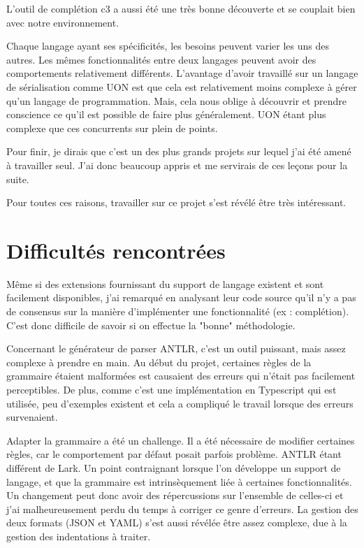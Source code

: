 \documentclass[
    iict, %
    il, %
]{heig-tb}
\begin{document}
L'outil de complétion c3 a aussi été une très bonne découverte et se couplait bien avec notre environnement.

Chaque langage ayant ses spécificités, les besoins peuvent varier les uns des autres.
Les mêmes fonctionnalités entre deux langages peuvent avoir des comportements relativement différents.
L'avantage d'avoir travaillé sur un langage de sérialisation comme UON est que cela est relativement moins complexe à gérer qu'un langage de programmation.
Mais, cela nous oblige à découvrir et prendre conscience ce qu'il est possible de faire plus généralement.
UON étant plus complexe que ces concurrents sur plein de points.

Pour finir, je dirais que c'est un des plus grands projets sur lequel j'ai été amené à travailler seul.
J'ai donc beaucoup appris et me servirais de ces leçons pour la suite.

Pour toutes ces raisons, travailler sur ce projet s'est révélé être très intéressant.


\section{Difficultés rencontrées}


Même si des extensions fournissant du support de langage existent et sont facilement disponibles, j'ai remarqué en analysant leur code source qu'il n'y a pas de consensus sur la manière d'implémenter une fonctionnalité (ex : complétion).
C'est donc difficile de savoir si on effectue la "bonne" méthodologie.

Concernant le générateur de parser ANTLR, c'est un outil puissant, mais assez complexe à prendre en main.
Au début du projet, certaines règles de la grammaire étaient malformées est causaient des erreurs qui n'était pas facilement perceptibles.
De plus, comme c'est une implémentation en Typescript qui est utilisée, peu d'exemples existent et cela a compliqué le travail lorsque des erreurs survenaient.

Adapter la grammaire a été un challenge. Il a été nécessaire de modifier certaines règles, car le comportement par défaut posait parfois problème. ANTLR étant différent de Lark.
Un point contraignant lorsque l'on développe un support de langage, et que la grammaire est intrinsèquement liée à certaines fonctionnalités.
Un changement peut donc avoir des répercussions sur l'ensemble de celles-ci et j'ai malheureusement perdu du temps à corriger ce genre d'erreurs.
La gestion des deux formats (JSON et YAML) s’est aussi révélée être assez complexe, due à la gestion des indentations à traiter.
\end{document}

